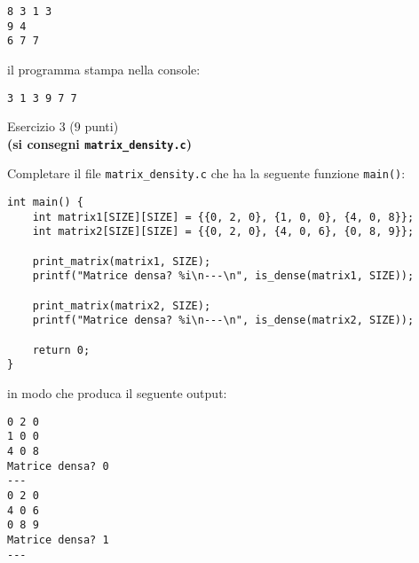 \documentclass[12pt]{article}
\begin{document}
\begin{mdframed}[backgroundcolor=verylightgray] 
\begin{verbatim}
8 3 1 3
9 4
6 7 7
\end{verbatim}
\end{mdframed}
il programma stampa nella console:
\begin{mdframed}[backgroundcolor=verylightgray] 
\begin{verbatim}
3 1 3 9 7 7
\end{verbatim}
\end{mdframed}

\vspace*{8ex}
\begin{center}{\Large Esercizio 3} ($9$ punti)\\
  \textbf{(si consegni \texttt{matrix\_density.c})}
\end{center}
Completare il file \texttt{matrix\_density.c} che ha la seguente funzione \texttt{main()}:

\begin{lstlisting}[language=myC]
int main() {
    int matrix1[SIZE][SIZE] = {{0, 2, 0}, {1, 0, 0}, {4, 0, 8}};
    int matrix2[SIZE][SIZE] = {{0, 2, 0}, {4, 0, 6}, {0, 8, 9}};

    print_matrix(matrix1, SIZE);
    printf("Matrice densa? %i\n---\n", is_dense(matrix1, SIZE));

    print_matrix(matrix2, SIZE);
    printf("Matrice densa? %i\n---\n", is_dense(matrix2, SIZE));

    return 0;
}
\end{lstlisting}
in modo che produca il seguente output:
\begin{mdframed}[backgroundcolor=verylightgray] 
\begin{verbatim}
0 2 0 
1 0 0 
4 0 8 
Matrice densa? 0
---
0 2 0 
4 0 6 
0 8 9 
Matrice densa? 1
---
\end{verbatim}
\end{mdframed}
\end{document}
